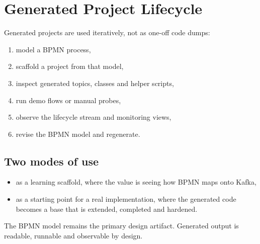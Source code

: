 \section{Generated Project Lifecycle}
\label{sec:ProjectLifecycle}

Generated projects are used iteratively, not as one-off code dumps:

\begin{enumerate}
\item model a BPMN process,
\item scaffold a project from that model,
\item inspect generated topics, classes and helper scripts,
\item run demo flows or manual probes,
\item observe the lifecycle stream and monitoring views,
\item revise the BPMN model and regenerate.
\end{enumerate}

\subsection{Two modes of use}

\begin{itemize}
\item as a learning scaffold, where the value is seeing how BPMN maps onto Kafka,
\item as a starting point for a real implementation, where the generated code becomes a
base that is extended, completed and hardened.
\end{itemize}

The BPMN model remains the primary design artifact. Generated output is readable, runnable
and observable by design.

